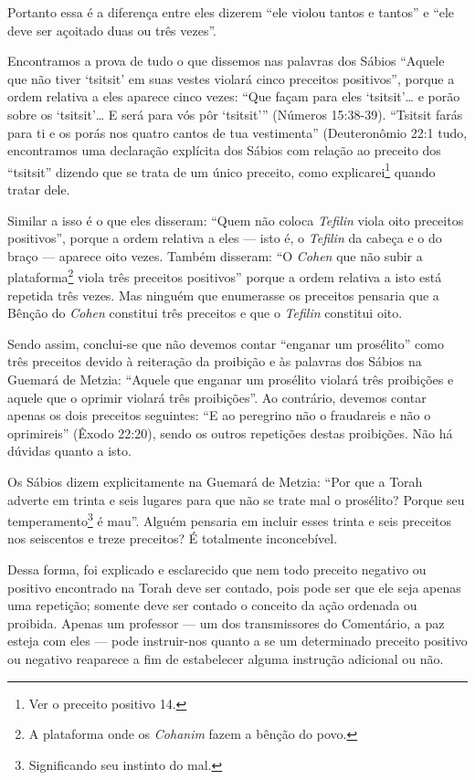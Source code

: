 Portanto essa é a diferença entre eles dizerem ``ele violou tantos e
tantos'' e ``ele deve ser açoitado duas ou três vezes''.

Encontramos a prova de tudo o que dissemos nas palavras dos Sábios
``Aquele que não tiver `tsitsit' em suas vestes violará cinco preceitos
positivos'', porque a ordem relativa a eles aparece cinco vezes: ``Que
façam para eles `tsitsit'\ldots{} e porão sobre os `tsitsit'\ldots{} E será para
vós pôr `tsitsit''' (Números 15:38-39). ``Tsitsit farás para ti e os
porás nos quatro cantos de tua vestimenta'' (Deuteronômio 22:1 tudo,
encontramos uma declaração explícita dos Sábios com relação ao preceito
dos ``tsitsit'' dizendo que se trata de um único preceito, como
explicarei\footnote{Ver o preceito positivo 14.} quando tratar dele.


Similar a isso é o que eles disseram: ``Quem não coloca \textit{Tefilin} viola oito preceitos positivos'', porque a ordem relativa a eles --- isto
é, o \textit{Tefilin} da cabeça e o do braço --- aparece oito vezes. Também disseram:
``O \textit{Cohen} que não subir a plataforma\footnote{A plataforma onde os \textit{Cohanim} fazem a bênção do povo.} viola três
preceitos positivos'' porque a ordem relativa a isto está repetida três vezes. Mas ninguém que enumerasse os
preceitos pensaria que a Bênção do \textit{Cohen} constitui três preceitos e
que o \textit{Tefilin} constitui oito.

Sendo assim, conclui-se que não devemos contar ``enganar um prosélito''
como três preceitos devido à reiteração da proibição e às palavras dos
Sábios na Guemará de Metzia: ``Aquele que enganar um prosélito violará
três proibições e aquele que o oprimir violará três proibições''. Ao
contrário, devemos contar apenas os dois preceitos seguintes: ``E ao
peregrino não o fraudareis e não o oprimireis'' (Êxodo 22:20), sendo os
outros repetições destas proibições. Não há dúvidas quanto a isto.

Os Sábios dizem explicitamente na Guemará de Metzia: ``Por que a
Torah adverte em trinta e seis lugares para que não se trate mal o
prosélito?
Porque seu temperamento\footnote{Significando seu instinto do mal.} é mau''. Alguém pensaria em incluir esses trinta e seis preceitos nos seiscentos e treze preceitos? É totalmente inconcebível.



Dessa forma, foi explicado e esclarecido que nem todo preceito negativo
ou positivo encontrado na Torah deve ser contado, pois pode ser que ele
seja apenas uma repetição; somente deve ser contado o conceito da ação
ordenada ou proibida. Apenas um professor --- um dos transmissores do
Comentário, a paz esteja com eles --- pode instruir-nos quanto a se um
determinado preceito positivo ou negativo reaparece a fim de
estabelecer alguma instrução adicional ou não.


